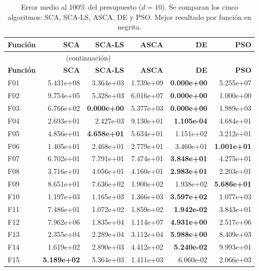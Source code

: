 \documentclass[12pt,a4paper]{article}
\begin{document}
\begin{longtable}{lrrrrr}
\caption{Error medio al 100\% del presupuesto ($d=10$). Se comparan los cinco algoritmos: SCA, SCA-LS, ASCA, DE y PSO. Mejor resultado por función en negrita.}
\label{tab:resultados_sca_ls_d10}\\
\toprule
\textbf{Función} & \textbf{SCA} & \textbf{SCA-LS} & \textbf{ASCA} & \textbf{DE} & \textbf{PSO}\\
\midrule
\endfirsthead
\multicolumn{4}{c}{\tablename~\thetable{} (continuación)}\\
\toprule
\textbf{Función} & \textbf{SCA} & \textbf{SCA-LS} & \textbf{ASCA} & \textbf{DE} & \textbf{PSO}\\
\midrule
\endhead
\midrule
\endfoot
\bottomrule
\endlastfoot
F01  & 5.431e+08 & 3.364e+03 & 1.739e+09 & \textbf{0.000e+00} & 5.255e+07 \\
F02  & 9.754e+05 & 5.328e+03 & 6.016e+07 & \textbf{0.000e+00} & 1.000e+00 \\
F03  & 6.766e+02 & \textbf{0.000e+00} & 5.377e+03 & \textbf{0.000e+00} & 1.989e+03 \\
F04  & 2.693e+01 & 2.427e-03 & 9.130e+01 & \textbf{1.105e-04} & 4.684e+01 \\
F05  & 4.856e+01 & \textbf{4.658e+01} & 5.634e+01 & 1.151e+02 & 3.212e+01 \\
F06  & 1.405e+01 & 2.468e+01 & 2.779e+01 & 3.460e+01 & \textbf{1.001e+01} \\
F07  & 6.702e+01 & 7.791e+01 & 7.474e+01 & \textbf{3.848e+01} & 4.275e+01 \\
F08  & 3.716e+01 & 4.056e+01 & 4.160e+01 & \textbf{2.983e+01} & 2.203e+01 \\
F09  & 8.651e+01 & 7.636e+02 & 1.900e+02 & 1.938e+02 & \textbf{5.686e+01} \\
F10  & 1.197e+03 & 1.165e+03 & 1.366e+03 & \textbf{3.597e+02} & 1.077e+03 \\
F11  & 7.486e+01 & 1.072e+02 & 1.859e+02 & \textbf{1.942e-02} & 3.843e+01 \\
F12  & 7.962e+06 & 1.835e+04 & 1.114e+07 & \textbf{4.931e+00} & 2.517e+06 \\
F13  & 2.355e+04 & 2.289e+04 & 3.112e+04 & \textbf{5.988e+00} & 8.409e+03 \\
F14  & 1.619e+02 & 2.890e+03 & 4.412e+02 & \textbf{5.240e-02} & 9.993e+01 \\
F15  & \textbf{5.189e+02} & 5.364e+03 & 1.411e+03 & 6.060e-02 & 2.066e+03 \\

\end{longtable}
\end{document}
